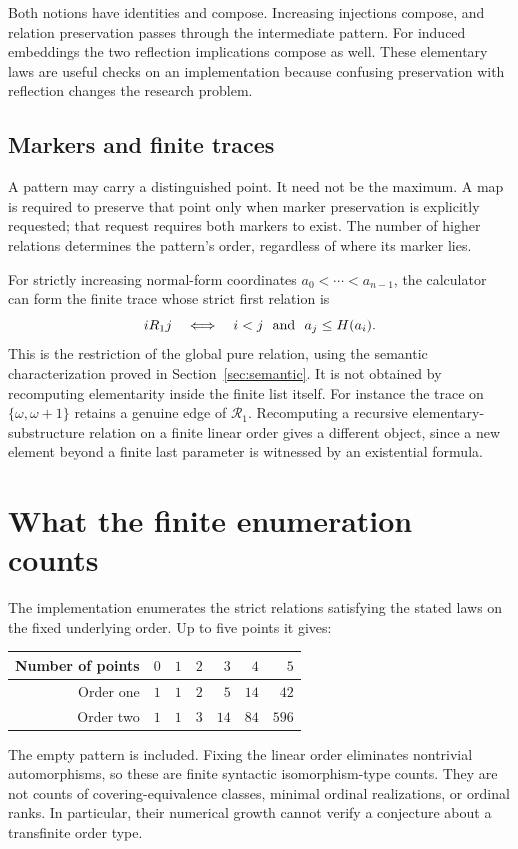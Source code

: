 \documentclass[11pt]{article}
\begin{document}
Both notions have identities and compose. Increasing injections compose,
and relation preservation passes through the intermediate pattern.
For induced embeddings the two reflection implications compose as well.
These elementary laws are useful checks on an implementation because
confusing preservation with reflection changes the research problem.

\subsection{Markers and finite traces}

A pattern may carry a distinguished point. It need not be the maximum.
A map is required to preserve that point only when marker preservation
is explicitly requested; that request requires both markers to exist.
The number of higher relations determines the pattern's order, regardless
of where its marker lies.

For strictly increasing normal-form coordinates $a_0<\cdots<a_{n-1}$,
the calculator can form the finite trace whose strict first relation is
\[
 iR_1j\quad\Longleftrightarrow\quad
 i<j\ \hbox{ and }\ a_j\leq H(a_i).
\]
This is the restriction of the global pure relation, using the
semantic characterization proved in Section~\ref{sec:semantic}. It is not obtained by recomputing elementarity inside
the finite list itself. For instance the trace on
$\{\omega,\omega+1\}$ retains a genuine edge of $\mathcal R_1$.
Recomputing a recursive elementary-substructure relation on a finite
linear order gives a different object, since a new element beyond a
finite last parameter is witnessed by an existential formula.

\section{What the finite enumeration counts}

The implementation enumerates the strict relations satisfying the stated
laws on the fixed underlying order. Up to five points it gives:
\begin{center}
\begin{tabular}{r|rrrrrr}
Number of points & $0$ & $1$ & $2$ & $3$ & $4$ & $5$\\\hline
Order one & $1$ & $1$ & $2$ & $5$ & $14$ & $42$\\
Order two & $1$ & $1$ & $3$ & $14$ & $84$ & $596$
\end{tabular}
\end{center}
The empty pattern is included. Fixing the linear order eliminates
nontrivial automorphisms, so these are finite syntactic isomorphism-type
counts. They are not counts of covering-equivalence classes, minimal
ordinal realizations, or ordinal ranks. In particular, their numerical
growth cannot verify a conjecture about a transfinite order type.
\end{document}

